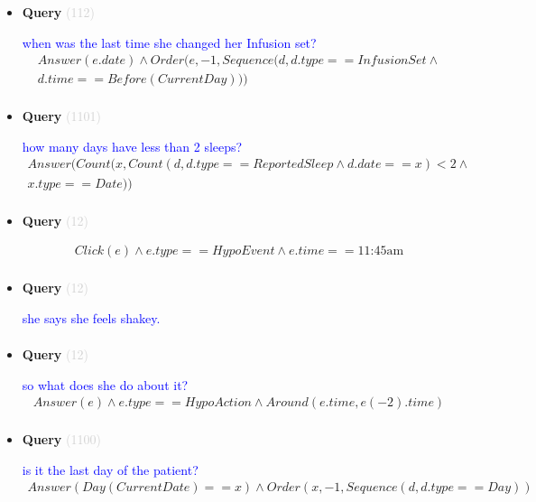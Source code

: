 \documentclass[11pt]{article}
\newcommand{\key}[1]{\textcolor{lightgray}{#1}}
\newcounter{CQuery}
\begin{document}
\begin{itemize}
\item
\textbf{Query\theCQuery} \key{(112)} \addtocounter{CQuery}{1}
\textcolor{blue}{ when was the last time she changed her Infusion set? }
\begin{multline*}
Answer(e.date) \wedge Order(e, -1, Sequence(d, d.type==InfusionSet\wedge \\ 
d.time==Before(CurrentDay))) \\ 
\end{multline*}


\item
\textbf{Query\theCQuery} \key{(1101)} \addtocounter{CQuery}{1}
\textcolor{blue}{ how many days have less than 2 sleeps? }
\begin{multline*}
Answer(Count(x, Count(d, d.type==ReportedSleep \wedge d.date==x)<2 \wedge \\ 
x.type==Date)) \\ 
\end{multline*}


\item
\textbf{Query\theCQuery} \key{(12)} \addtocounter{CQuery}{1}
\textcolor{blue}{  }
\begin{multline*}
Click(e) \wedge e.type == HypoEvent \wedge e.time == \mbox{11:45am} \\ 
\end{multline*}


\item
\textbf{Query\theCQuery} \key{(12)} \addtocounter{CQuery}{1}
\textcolor{blue}{ she says she feels shakey. }
\begin{multline*}
\end{multline*}


\item
\textbf{Query\theCQuery} \key{(12)} \addtocounter{CQuery}{1}
\textcolor{blue}{ so what does she do about it? }
\begin{multline*}
Answer(e) \wedge e.type == HypoAction \wedge Around(e.time, e(-2).time) \\ 
\end{multline*}


\item
\textbf{Query\theCQuery} \key{(1100)} \addtocounter{CQuery}{1}
\textcolor{blue}{ is it the last day of the patient? }
\begin{multline*}
Answer(Day(CurrentDate)==x) \wedge Order(x, -1, Sequence(d, d.type==Day)) \\ 
\end{multline*}



\end{itemize}
\end{document}
